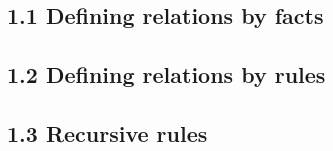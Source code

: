 
\subsection*{1.1 Defining relations by facts}


\subsection*{1.2 Defining relations by rules}


\subsection*{1.3 Recursive rules}


